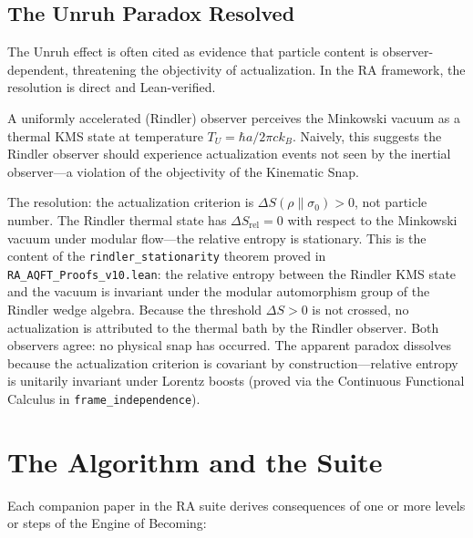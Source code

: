 \documentclass[11pt,a4paper]{article}
\theoremstyle{plain}
\theoremstyle{definition}
\theoremstyle{remark}
\begin{document}
\subsection{The Unruh Paradox Resolved}

The Unruh effect is often cited as evidence that particle content is
observer-dependent, threatening the objectivity of actualization. In the RA
framework, the resolution is direct and Lean-verified.

A uniformly accelerated (Rindler) observer perceives the Minkowski vacuum as
a thermal KMS state at temperature $T_U = \hbar a / 2\pi c k_B$. Naively,
this suggests the Rindler observer should experience actualization events not
seen by the inertial observer---a violation of the objectivity of the
Kinematic Snap.

The resolution: the actualization criterion is $\Delta S(\rho\|\sigma_0) > 0$,
not particle number. The Rindler thermal state has $\Delta S_{\mathrm{rel}} = 0$
with respect to the Minkowski vacuum under modular flow---the relative entropy
is stationary. This is the content of the \texttt{rindler\_stationarity}
theorem proved in \texttt{RA\_AQFT\_Proofs\_v10.lean}: the relative entropy
between the Rindler KMS state and the vacuum is invariant under the modular
automorphism group of the Rindler wedge algebra. Because the threshold
$\Delta S > 0$ is not crossed, no actualization is attributed to the thermal
bath by the Rindler observer. Both observers agree: no physical snap has
occurred. The apparent paradox dissolves because the actualization criterion
is covariant by construction---relative entropy is unitarily invariant under
Lorentz boosts (proved via the Continuous Functional Calculus in
\texttt{frame\_independence}).

\section{The Algorithm and the Suite}
\label{sec:suite}

Each companion paper in the RA suite derives consequences of one or more
levels or steps of the Engine of Becoming:
\end{document}
